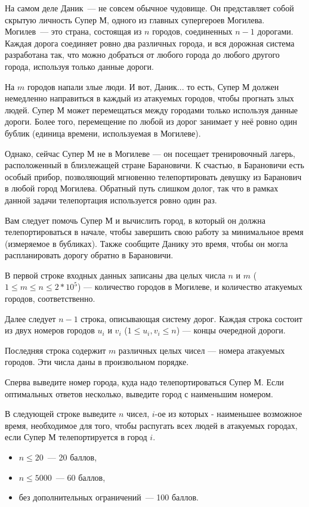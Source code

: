 
\Legend

На самом деле Даник~--- не совсем обычное чудовище. Он представляет собой скрытую личность Супер М, одного из главных супергероев Могилева. Могилев~--- это страна, состоящая из $n$ городов, соединенных $n - 1$ дорогами. Каждая дорога соединяет ровно два различных города, и вся дорожная система разработана так, что можно добраться от любого города до любого другого города, используя только данные дороги.

На $m$ городов напали злые люди. И вот, Даник... то есть, Супер М должен немедленно направиться в каждый из атакуемых городов, чтобы прогнать злых людей. Супер М может перемещаться между городами только используя данные дороги. Более того, перемещение по любой из дорог занимает у неё ровно один бублик (единица времени, используемая в Могилеве).

Однако, сейчас Супер М не в Могилеве — он посещает тренировочный лагерь, расположенный в близлежащей стране Барановичи. К счастью, в Барановичи есть особый прибор, позволяющий мгновенно телепортировать девушку из Баранович в любой город Могилева. Обратный путь слишком долог, так что в рамках данной задачи телепортация используется ровно один раз.

Вам следует помочь Супер М и вычислить город, в который он должна телепортироваться в начале, чтобы завершить свою работу за минимальное время (измеряемое в бубликах). Также сообщите Данику это время, чтобы он могла распланировать дорогу обратно в Барановичи.

\Input

В первой строке входных данных записаны два целых числа $n$ и $m$ ($1 \le m \le n \le 2 * 10^5$) — количество городов в Могилеве, и количество атакуемых городов, соответственно.

Далее следует $n - 1$ строка, описывающая систему дорог. Каждая строка состоит из двух номеров городов $u_i$ и $v_i$ ($1 \le u_i, v_i \le n$) — концы очередной дороги.

Последняя строка содержит $m$ различных целых чисел — номера атакуемых городов. Эти числа даны в произвольном порядке.

\Output

Сперва выведите номер города, куда надо телепортироваться Супер М. Если оптимальных ответов несколько, выведите город с наименьшим номером.

В следующей строке выведите $n$ чисел, $i$-ое из которых - наименьшее возможное время, необходимое для того, чтобы распугать всех людей в атакуемых городах, если Супер М телепортируется в город $i$.

\Samples
\BeginTests
\EndTests

\Scoring
\begin{itemize}
	\item $n \le 20$~--- 20 баллов,
	\item $n \le 5000$~--- 60 баллов,
	\item без дополнительных ограничений~--- 100 баллов.
\end{itemize}

\EndProblem
